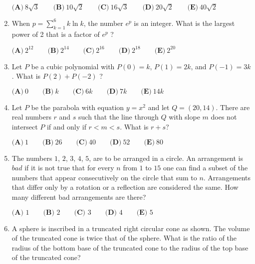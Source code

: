 \documentclass{article}
\begin{document}
\begin{enumerate}[label=\arabic*., itemsep=0.5em]
$ \textbf{(A)}\ 8\sqrt{3}\qquad\textbf{(B)}\ 10\sqrt{2}\qquad\textbf{(C)}\ 16\sqrt{3}\qquad\textbf{(D)}\ 20\sqrt{2}\qquad\textbf{(E)}\ 40\sqrt{2} $\par \vspace{0.5em}\item When $p = \sum\limits_{k=1}^{6} k \ln{k}$, the number $e^p$ is an integer.  What is the largest power of 2 that is a factor of $e^p$ ?

$ \textbf{(A)}\ 2^{12}\qquad\textbf{(B)}\ 2^{14}\qquad\textbf{(C)}\ 2^{16}\qquad\textbf{(D)}\ 2^{18}\qquad\textbf{(E)}\ 2^{20} $\par \vspace{0.5em}\item Let $P$ be a cubic polynomial with $P(0) = k$, $P(1) = 2k$, and $P(-1) = 3k$.  What is $P(2) + P(-2)$ ?

$ \textbf{(A)}\ 0\qquad\textbf{(B)}\ k\qquad\textbf{(C)}\ 6k\qquad\textbf{(D)}\ 7k\qquad\textbf{(E)}\ 14k $\par \vspace{0.5em}\item Let $P$ be the parabola with equation $y=x^2$ and let $Q = (20, 14)$. There are real numbers $r$ and $s$ such that the line through $Q$ with slope $m$ does not intersect $P$ if and only if $r < m < s$. What is $r + s$?

$ \textbf{(A)}\ 1\qquad\textbf{(B)}\ 26\qquad\textbf{(C)}\ 40\qquad\textbf{(D)}\ 52\qquad\textbf{(E)}\ 80 $\par \vspace{0.5em}\item The numbers $1$, $2$, $3$, $4$, $5$, are to be arranged in a circle.  An arrangement is $\textit{bad}$ if it is not true that for every $n$ from $1$ to $15$ one can find a subset of the numbers that appear consecutively on the circle that sum to $n$.  Arrangements that differ only by a rotation or a reflection are considered the same.  How many different bad arrangements are there?

$ \textbf{(A) }1\qquad\textbf{(B) }2\qquad\textbf{(C) }3\qquad\textbf{(D) }4\qquad\textbf{(E) }5 $\par \vspace{0.5em}\item A sphere is inscribed in a truncated right circular cone as shown. The volume of the truncated cone is twice that of the sphere. What is the ratio of the radius of the bottom base of the truncated cone to the radius of the top base of the truncated cone?


\end{enumerate}
\end{document}
